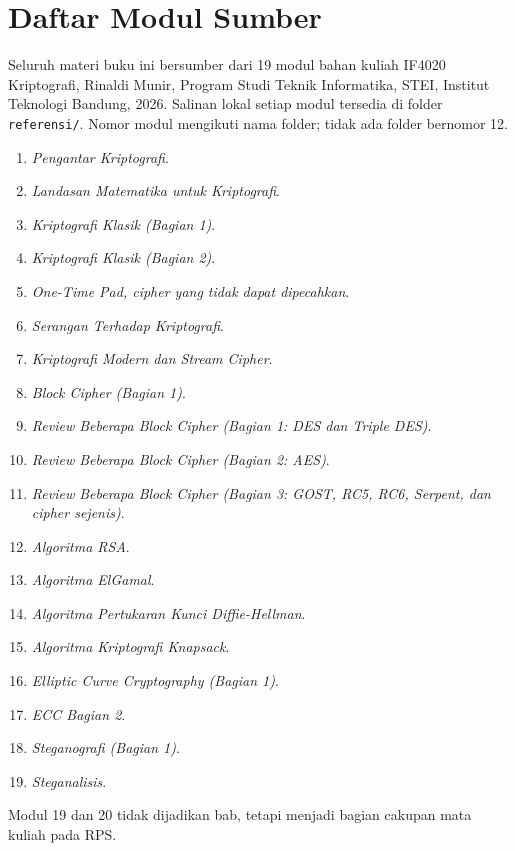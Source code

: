 \documentclass[../main.tex]{subfiles}
\begin{document}
\chapter{Daftar Modul Sumber}

Seluruh materi buku ini bersumber dari 19 modul bahan kuliah IF4020 Kriptografi,
Rinaldi Munir, Program Studi Teknik Informatika, STEI, Institut Teknologi
Bandung, 2026. Salinan lokal setiap modul tersedia di folder \texttt{referensi/}.
Nomor modul mengikuti nama folder; tidak ada folder bernomor 12.

\begin{enumerate}[leftmargin=*]
    \item \textit{Pengantar Kriptografi}.
    \item \textit{Landasan Matematika untuk Kriptografi}.
    \item \textit{Kriptografi Klasik (Bagian 1)}.
    \item \textit{Kriptografi Klasik (Bagian 2)}.
    \item \textit{One-Time Pad, cipher yang tidak dapat dipecahkan}.
    \item \textit{Serangan Terhadap Kriptografi}.
    \item \textit{Kriptografi Modern dan Stream Cipher}.
    \item \textit{Block Cipher (Bagian 1)}.
    \item \textit{Review Beberapa Block Cipher (Bagian 1: DES dan Triple DES)}.
    \item \textit{Review Beberapa Block Cipher (Bagian 2: AES)}.
    \item \textit{Review Beberapa Block Cipher (Bagian 3: GOST, RC5, RC6,
          Serpent, dan cipher sejenis)}.
    \item \textit{Algoritma RSA}.
    \item \textit{Algoritma ElGamal}.
    \item \textit{Algoritma Pertukaran Kunci Diffie-Hellman}.
    \item \textit{Algoritma Kriptografi Knapsack}.
    \item \textit{Elliptic Curve Cryptography (Bagian 1)}.
    \item \textit{ECC Bagian 2}.
    \item \textit{Steganografi (Bagian 1)}.
    \item \textit{Steganalisis}.
\end{enumerate}

Modul 19 dan 20 tidak dijadikan bab, tetapi menjadi bagian cakupan mata kuliah
pada RPS.
\end{document}
